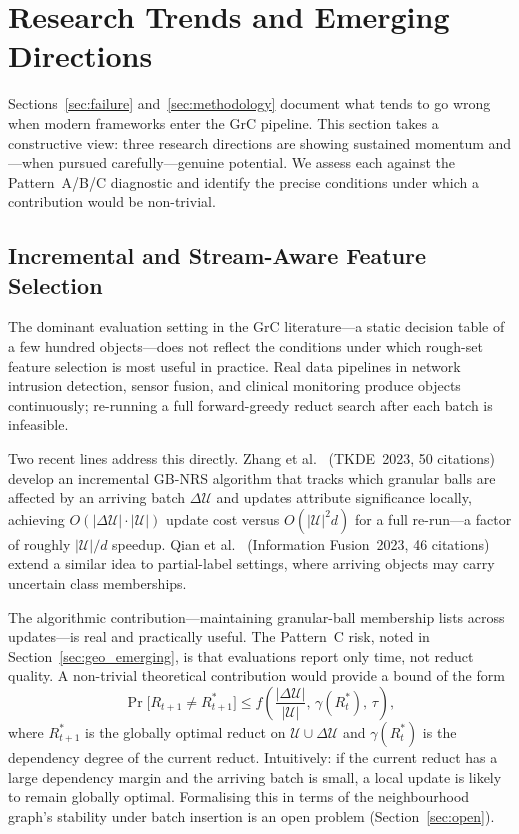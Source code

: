 \section{Research Trends and Emerging Directions}
\label{sec:trends}

Sections~\ref{sec:failure} and~\ref{sec:methodology} document what tends
to go wrong when modern frameworks enter the GrC pipeline.  This section
takes a constructive view: three research directions are showing sustained
momentum and---when pursued carefully---genuine potential.  We assess each
against the Pattern~A/B/C diagnostic and identify the precise conditions
under which a contribution would be non-trivial.

\subsection{Incremental and Stream-Aware Feature Selection}
\label{sec:trend_incremental}

The dominant evaluation setting in the GrC literature---a static decision
table of a few hundred objects---does not reflect the conditions under which
rough-set feature selection is most useful in practice.  Real data pipelines
in network intrusion detection, sensor fusion, and clinical monitoring produce
objects continuously; re-running a full forward-greedy reduct search after
each batch is infeasible.

Two recent lines address this directly.
Zhang et al.~\cite{Zhang2023TKDEincremental} (TKDE~2023, 50 citations)
develop an incremental GB-NRS algorithm that tracks which granular balls
are affected by an arriving batch $\Delta\mathcal{U}$ and updates attribute
significance locally, achieving $O(|\Delta\mathcal{U}| \cdot |\mathcal{U}|)$
update cost versus $O(|\mathcal{U}|^2 d)$ for a full re-run---a factor of
roughly $|\mathcal{U}|/d$ speedup.  Qian et al.~\cite{Qian2023InfoFusion}
(Information Fusion~2023, 46 citations) extend a similar idea to
partial-label settings, where arriving objects may carry uncertain class
memberships.

The algorithmic contribution---maintaining granular-ball membership lists
across updates---is real and practically useful.  The Pattern~C risk, noted
in Section~\ref{sec:geo_emerging}, is that evaluations report only time, not
reduct quality.  A non-trivial theoretical contribution would provide a bound
of the form
\[
  \Pr\bigl[R_{t+1} \neq R^*_{t+1}\bigr] \leq f\!\left(\frac{|\Delta\mathcal{U}|}{|\mathcal{U}|},\,
  \gamma(R^*_t),\, \tau\right),
\]
where $R^*_{t+1}$ is the globally optimal reduct on
$\mathcal{U}\cup\Delta\mathcal{U}$ and $\gamma(R^*_t)$ is the dependency
degree of the current reduct.  Intuitively: if the current reduct has a large
dependency margin and the arriving batch is small, a local update is likely to
remain globally optimal.  Formalising this in terms of the neighbourhood
graph's stability under batch insertion is an open problem
(Section~\ref{sec:open}).

